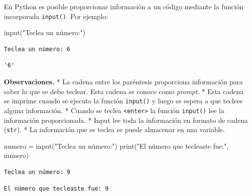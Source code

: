 \documentclass[
  spanish,
  letterpaper,
]{scrbook}
\newenvironment{Shaded}{\begin{snugshade}}{\end{snugshade}}
\newcommand{\BuiltInTok}[1]{\textcolor[rgb]{0.00,0.23,0.31}{#1}}
\newcommand{\NormalTok}[1]{\textcolor[rgb]{0.00,0.23,0.31}{#1}}
\newcommand{\OperatorTok}[1]{\textcolor[rgb]{0.37,0.37,0.37}{#1}}
\newcommand{\StringTok}[1]{\textcolor[rgb]{0.13,0.47,0.30}{#1}}
\theoremstyle{definition}
\theoremstyle{remark}
\begin{document}
En Python es posible proporcionar información a un código mediante la
función incorporada \texttt{input()}. Por ejemplo:

\begin{Shaded}
\begin{Highlighting}[]
\BuiltInTok{input}\NormalTok{(}\StringTok{"Teclea un número:"}\NormalTok{)}
\end{Highlighting}
\end{Shaded}

\begin{verbatim}
Teclea un número: 6
\end{verbatim}

\begin{verbatim}
'6'
\end{verbatim}

\textbf{Observaciones.} * La cadena entre los paréntesis proporciona
información para saber lo que se debe teclear. Esta cadena se conoce
como \emph{prompt}. * Esta cadena se imprime cuando se ejecuta la
función \texttt{input()} y luego se espera a que teclees alguna
información. * Cuando se teclea \texttt{\textless{}enter\textgreater{}}
la función \texttt{input()} lee la información proporcionada. * Input
lee toda la información en formato de cadena (\texttt{str}). * La
información que se teclea se puede almacenar en una variable.

\begin{Shaded}
\begin{Highlighting}[]
\NormalTok{numero }\OperatorTok{=} \BuiltInTok{input}\NormalTok{(}\StringTok{"Teclea un número:"}\NormalTok{)}
\BuiltInTok{print}\NormalTok{(}\StringTok{"El número que tecleaste fue:"}\NormalTok{, numero)}
\end{Highlighting}
\end{Shaded}

\begin{verbatim}
Teclea un número: 9
\end{verbatim}

\begin{verbatim}
El número que tecleaste fue: 9
\end{verbatim}
\end{document}
